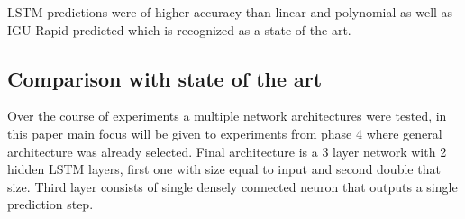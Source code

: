 \documentclass{article}
\begin{document}
LSTM predictions were of higher accuracy than linear and polynomial as well as IGU Rapid
predicted which is recognized as a state of the art.

\subsection{Comparison with state of the art}
Over the course of experiments a multiple network architectures were tested, in this paper
main focus will be given to experiments from phase 4 where general architecture was already
selected.
Final architecture is a 3 layer network with 2 hidden LSTM layers, first one with size equal
to input and second double that size. Third layer consists of single densely connected neuron
that outputs a single prediction step.
\end{document}
